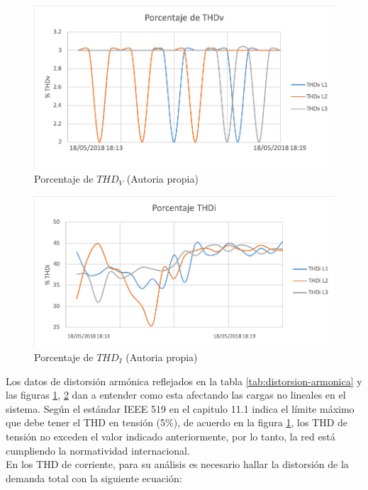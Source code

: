 \begin{figure}[H]
\centering
\includegraphics{2Marco/porcentaje-thdv}
\caption{Porcentaje de $THD_{V}$ (Autoria propia)} 
\label{fig:porcentaje-thdv}
\end{figure} 

\begin{figure}[H]
\centering
\includegraphics{2Marco/porcentaje-thdi}
\caption{Porcentaje de $THD_{I}$ (Autoria propia)} 
\label{fig:porcentaje-thdi}
\end{figure} 

Los datos de distorsión armónica reflejados en la tabla \ref{tab:distorsion-armonica} y las figuras \ref{fig:porcentaje-thdv}, \ref{fig:porcentaje-thdi} dan a entender como esta afectando las cargas no lineales en el sistema. Según el estándar IEEE 519 en el capitulo 11.1 indica el límite máximo que debe tener el THD en tensión (5\%), de acuerdo en la figura \ref{fig:porcentaje-thdv}, los THD de tensión no exceden el valor indicado anteriormente, por lo tanto, la red está cumpliendo la normatividad internacional.\\ 
En los THD de corriente, para su análisis es necesario hallar la distorsión de la demanda total con la siguiente ecuación:\\

